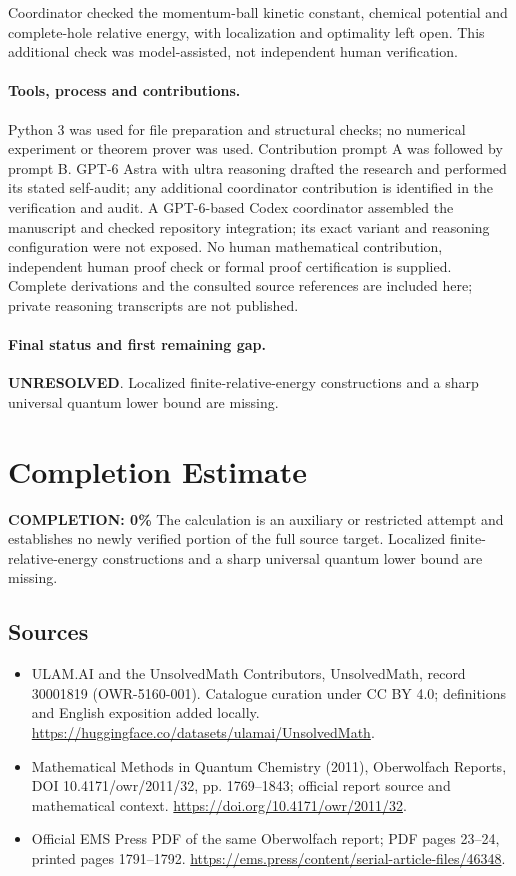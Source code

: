 \documentclass[11pt]{article}
\begin{document}
Coordinator checked the momentum-ball kinetic constant, chemical potential and complete-hole relative energy, with localization and optimality left open. This additional check was model-assisted, not independent human verification.

\paragraph{Tools, process and contributions.}
Python 3 was used for file preparation and structural checks; no numerical experiment or theorem prover was used. Contribution prompt A was followed by prompt B. GPT-6 Astra with ultra reasoning drafted the research and performed its stated self-audit; any additional coordinator contribution is identified in the verification and audit. A GPT-6-based Codex coordinator assembled the manuscript and checked repository integration; its exact variant and reasoning configuration were not exposed. No human mathematical contribution, independent human proof check or formal proof certification is supplied. Complete derivations and the consulted source references are included here; private reasoning transcripts are not published.

\paragraph{Final status and first remaining gap.}
\textbf{UNRESOLVED}. Localized finite-relative-energy constructions and a sharp universal quantum lower bound are missing.

\section{Completion Estimate}
\noindent\textbf{COMPLETION: 0\%}
The calculation is an auxiliary or restricted attempt and establishes no newly verified portion of the full source target. Localized finite-relative-energy constructions and a sharp universal quantum lower bound are missing.

\subsection{Sources}
\begin{itemize}
\item[\hypertarget{source:30001819:1}{S1}] ULAM.AI and the UnsolvedMath Contributors, UnsolvedMath, record 30001819 (OWR-5160-001). Catalogue curation under CC BY 4.0; definitions and English exposition added locally.
\url{https://huggingface.co/datasets/ulamai/UnsolvedMath}.
\item[\hypertarget{source:30001819:2}{S2}] Mathematical Methods in Quantum Chemistry (2011), Oberwolfach Reports, DOI 10.4171/owr/2011/32, pp. 1769--1843; official report source and mathematical context.
\url{https://doi.org/10.4171/owr/2011/32}.
\item[\hypertarget{source:30001819:3}{S3}] Official EMS Press PDF of the same Oberwolfach report; PDF pages 23--24, printed pages 1791--1792.
\url{https://ems.press/content/serial-article-files/46348}.
\end{itemize}
\label{end:30001819}
\end{document}

